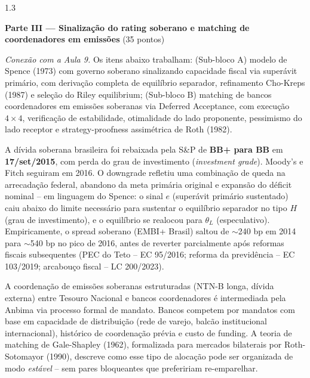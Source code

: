 \documentclass[11pt,addpoints]{exam}
\begin{document}
\begin{spacing}{1.3}
\begin{questions}
\end{questions}

\newpage

\begin{center}\large\textbf{Parte III --- Sinalização do rating soberano e matching de coordenadores em emissões} \quad (35 pontos)\end{center}

\textit{Conexão com a Aula 9.} Os itens abaixo trabalham: (Sub-bloco A) modelo de Spence (1973) com governo soberano sinalizando capacidade fiscal via superávit primário, com derivação completa de equilíbrio separador, refinamento Cho-Kreps (1987) e seleção do Riley equilibrium; (Sub-bloco B) matching de bancos coordenadores em emissões soberanas via Deferred Acceptance, com execução $4 \times 4$, verificação de estabilidade, otimalidade do lado proponente, pessimismo do lado receptor e strategy-proofness assimétrica de Roth (1982).

\begin{contextbox}
\small
A dívida soberana brasileira foi rebaixada pela S\&P de \textbf{BB+ para BB} em \textbf{17/set/2015}, com perda do grau de investimento (\emph{investment grade}). Moody's e Fitch seguiram em 2016. O downgrade refletiu uma combinação de queda na arrecadação federal, abandono da meta primária original e expansão do déficit nominal -- em linguagem do Spence: o sinal $e$ (superávit primário sustentado) caiu abaixo do limite necessário para sustentar o equilíbrio separador no tipo $H$ (grau de investimento), e o equilíbrio se realocou para $\theta_L$ (especulativo). Empiricamente, o spread soberano (EMBI+ Brasil) saltou de $\sim$240 bp em 2014 para $\sim$540 bp no pico de 2016, antes de reverter parcialmente após reformas fiscais subsequentes (PEC do Teto -- EC 95/2016; reforma da previdência -- EC 103/2019; arcabouço fiscal -- LC 200/2023).

A coordenação de emissões soberanas estruturadas (NTN-B longa, dívida externa) entre Tesouro Nacional e bancos coordenadores é intermediada pela Anbima via processo formal de mandato. Bancos competem por mandatos com base em capacidade de distribuição (rede de varejo, balcão institucional internacional), histórico de coordenação prévia e custo de funding. A teoria de matching de Gale-Shapley (1962), formalizada para mercados bilaterais por Roth-Sotomayor (1990), descreve como esse tipo de alocação pode ser organizada de modo \emph{estável} -- sem pares bloqueantes que prefeririam re-emparelhar.
\end{contextbox}


\end{spacing}
\end{document}
